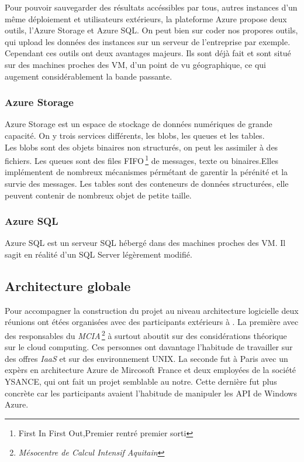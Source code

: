 Pour pouvoir sauvegarder des résultats accéssibles par tous, autres
instances d'un même déploiement et utilisateurs extérieurs, la
plateforme Azure propose deux outils, l'Azure Storage et Azure SQL.
On peut bien sur coder nos propores outils, qui upload les données des
instances sur un serveur de l'entreprise par exemple. Cependant ces
outils ont deux avantages majeurs. Ils sont déjà fait et sont situé
sur des machines proches des VM, d'un point de vu géographique, ce qui
augement considérablement la bande passante.\\


\subsubsection{Azure Storage}
Azure Storage est un espace de stockage de données numériques de
grande capacité. On y trois services différents, les blobs, les queues et les tables.\\

Les blobs sont des objets binaires non structurés, on peut les
assimiler à des fichiers. Les queues sont des files
FIFO\,\footnote{{First In First Out},Premier rentré premier sorti} de
messages, texte ou binaires.Elles implémentent de nombreux mécanismes
pérmétant de garentir la pérénité et la survie des messages. Les
tables sont des conteneurs de données structurées, elle peuvent
contenir de nombreux objet de petite taille.\\



\subsubsection{Azure SQL}
Azure SQL est un serveur SQL hébergé dans des machines proches des
VM. Il sagit en réalité d'un SQL Server légèrement modifié.\\
%
%


\subsection{Architecture globale}
Pour accompagner la construction du projet au niveau architecture
logicielle deux réunions ont étées organisées avec des participants
extérieurs à \maxsea. La première avec des responsables du
\textit{MCIA}\,\footnote{\textit{Mésocentre de Calcul Intensif
    Aquitain}} à surtout aboutit sur des considérations théorique sur
le cloud computing. Ces personnes ont davantage l'habitude de
travailler sur des offres \textit{IaaS} et sur des environnement
UNIX. La seconde fut à Paris avec un expèrs en architecture Azure de
Mircosoft France et deux employées de la société YSANCE, qui ont fait
un projet semblable au notre. Cette dernière fut plus concrète car les
participants avaient l'habitude de manipuler les API de Windows
Azure. \\




